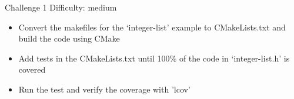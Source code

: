 \documentclass{beamer}
\begin{document}
\begin{frame}{Challenge 1}
\alert{Difficulty: medium}

\begin{itemize}
\item Convert the makefiles for the ‘integer-list’ example to CMakeLists.txt and build the code using CMake
\item Add tests in the CMakeLists.txt until 100\% of the code in ‘integer-list.h’ is covered
\item Run the test and verify the coverage with 'lcov'
\end{itemize}

\end{frame}
\end{document}
